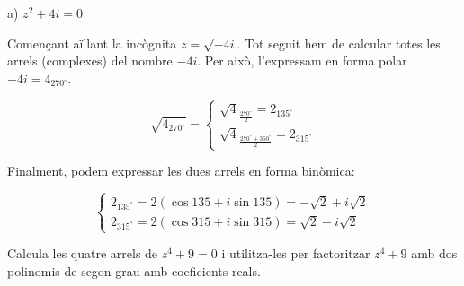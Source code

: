 \begin{example}[*]
	a)  $z^2+4i=0$
	
	Començant aïllant la incògnita $z=\sqrt{-4i}$. Tot seguit hem de calcular totes les arrels (complexes) del nombre $-4i$. Per això, l'expressam en forma polar $-4i=4_{270^\circ}$.
	
	\[ \sqrt{4_{270^\circ}} = \left\{
		\begin{array}{l}
		\sqrt{4}_{\frac{270^\circ}{2}} = 2_{135^\circ} \\ 
		\sqrt{4}_{\frac{270^\circ+360^\circ}{2}} = 2_{315^\circ}
		\end{array} 
		\right.  \]
		
	Finalment, podem expressar les dues arrels en forma binòmica:
	
	\[ \left\{
	\begin{array}{l}
  2_{135^\circ} = 2 (\cos 135 + i\sin 135)= -\sqrt{2}+i\sqrt{2} \\ 
  2_{315^\circ} =  2 (\cos 315 + i\sin 315)= \sqrt{2}-i\sqrt{2}
	\end{array} 
	\right. \]
	
\end{example}

\begin{mylist}
 
\exer Calcula les quatre arrels de $z^4+9=0$ i utilitza-les per factoritzar $z^4+9$ amb dos polinomis de segon grau amb coeficients reals.
\end{mylist}




